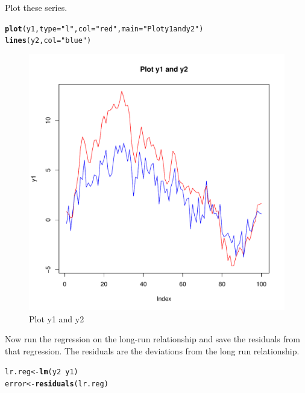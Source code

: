 \documentclass{article}\usepackage{graphicx, color}
\makeatletter
\def\maxwidth{ %
  \ifdim\Gin@nat@width>\linewidth
    \linewidth
  \else
    \Gin@nat@width
  \fi
}
\newcommand{\hlfunctioncall}[1]{\textcolor[rgb]{0.501960784313725,0,0.329411764705882}{\textbf{#1}}}%
\newcommand{\hlstring}[1]{\textcolor[rgb]{0.6,0.6,1}{#1}}%
\newenvironment{kframe}{%
 \def\at@end@of@kframe{}%
 \ifinner\ifhmode%
  \def\at@end@of@kframe{\end{minipage}}%
  \begin{minipage}{\columnwidth}%
 \fi\fi%
 \def\FrameCommand##1{\hskip\@totalleftmargin \hskip-\fboxsep
 \colorbox{shadecolor}{##1}\hskip-\fboxsep
     \hskip-\linewidth \hskip-\@totalleftmargin \hskip\columnwidth}%
 \MakeFramed {\advance\hsize-\width
   \@totalleftmargin\z@ \linewidth\hsize
   \@setminipage}}%
 {\par\unskip\endMakeFramed%
 \at@end@of@kframe}
\newenvironment{knitrout}{}{} %
\makeatother
\begin{document}
Plot these series.
\begin{knitrout}
\color{fgcolor}\begin{kframe}
\begin{alltt}
\hlfunctioncall{plot}(y1, type = \hlstring{"l"}, col = \hlstring{"red"}, main = \hlstring{"Plot y1 and y2"})
\hlfunctioncall{lines}(y2, col = \hlstring{"blue"})
\end{alltt}
\end{kframe}\begin{figure}[]

\includegraphics[width=\maxwidth]{figure/Plot-EG} \caption[Plot y1 and y2]{Plot y1 and y2\label{fig:Plot-EG}}
\end{figure}


\end{knitrout}

Now run the regression on the long-run relationship and save the residuals from that regression.  The residuals are the deviations from the long run relationship.  
\begin{knitrout}
\color{fgcolor}\begin{kframe}
\begin{alltt}
lr.reg <- \hlfunctioncall{lm}(y2 ~ y1)
error <- \hlfunctioncall{residuals}(lr.reg)
\end{alltt}
\end{kframe}
\end{knitrout}
\end{document}
